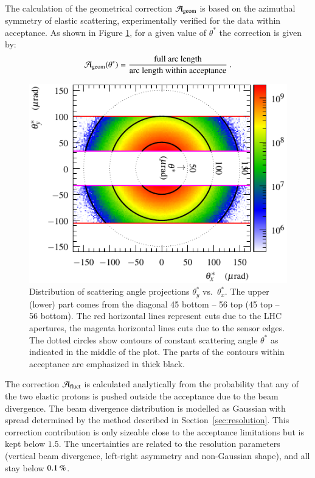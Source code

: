 The calculation of the geometrical correction ${\cal A}_{\rm geom}$ is based on the azimuthal symmetry of elastic scattering, experimentally verified for the data within acceptance. As shown in Figure \ref{fig:acceptance principle}, for a given value of $\theta^*$ the correction is given by:
\begin{equation}
\label{eq:acc geom}
{\cal A_{\rm geom}}(\theta^*) = {
	\hbox{full arc length}\over 
	\hbox{arc length within acceptance}
} \ .
\end{equation}


\begin{figure}
\begin{center}
\includegraphics{fig/acc_corr_phi_lab.pdf}
\vskip-3mm
\caption{%
Distribution of scattering angle projections $\theta_y^*$ vs.~$\theta_x^*$. The upper (lower) part comes from the diagonal 45 bottom -- 56 top (45 top -- 56 bottom). The red horizontal lines represent cuts due to the LHC apertures, the magenta horizontal lines cuts due to the sensor edges. The dotted circles show contours of constant scattering angle $\theta^*$ as indicated in the middle of the plot. The parts of the contours within acceptance are emphasized in thick black.
}
\label{fig:acceptance principle}
\end{center}
\end{figure}


The correction ${\cal A}_{\rm fluct}$ is calculated analytically from the probability that any of the two elastic protons is pushed outside the acceptance due to the beam divergence. The beam divergence distribution is modelled as Gaussian with spread determined by the method described in Section~\ref{sec:resolution}. This correction contribution is only sizeable close to the acceptance limitations but is kept below $1.5$. The uncertainties are related to the resolution parameters (vertical beam divergence, left-right asymmetry and non-Gaussian shape), and all stay below $0.1\,{\rm \%}$.


